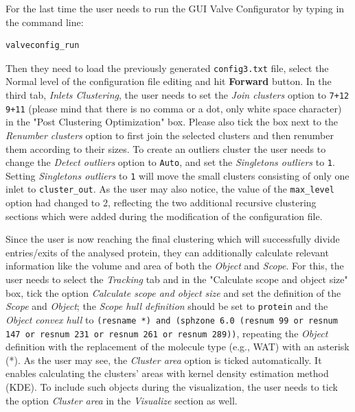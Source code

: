 \documentclass[9pt,tutorial]{livecoms}
\begin{document}
For the last time the user needs to run the GUI Valve Configurator by typing in the command line:
\begin{lstlisting}
valveconfig_run
\end{lstlisting}
Then they need to load the previously generated \texttt{config3.txt} file, select the Normal level of the configuration file editing and hit \textbf{Forward} button. In the third tab, \textit{Inlets Clustering}, the user needs to set the \emph{Join clusters} option to \texttt{7+12 9+11} (please mind that there is no comma or a dot, only white space character) in the "Post Clustering Optimization" box. Please also tick the box next to the \emph{Renumber clusters} option to first join the selected clusters and then renumber them according to their sizes. To create an outliers cluster the user needs to change the \emph{Detect outliers} option to \texttt{Auto}, and set the \emph{Singletons outliers} to \texttt{1}. Setting \emph{Singletons outliers} to \texttt{1} will move the small clusters consisting of only one inlet to \texttt{cluster\_out}. As the user may also notice, the value of the \texttt{max\_level} option had changed to 2, reflecting the two additional recursive clustering sections which were added during the modification of the configuration file. 

Since the user is now reaching the final clustering which will successfully divide entries/exits of the analysed protein, they can additionally calculate relevant information like the volume and area of both the \textit{Object} and \textit{Scope}. For this, the user needs to select the \textit{Tracking} tab and in the "Calculate scope and object size" box, tick the option \textit{Calculate scope and object size} and set the definition of the \textit{Scope} and \textit{Object}; the \textit{Scope hull definition} should be set to \texttt{protein} and the \textit{Object convex hull} to \texttt{(resname *) and (sphzone 6.0 (resnum 99 or resnum 147 or resnum 231 or resnum 261 or resnum 289))}, repeating the \textit{Object} definition with the replacement of the molecule type (e.g., WAT) with an asterisk (*). As the user may see, the \textit{Cluster area} option is ticked automatically. It enables calculating the clusters’ areas with kernel density estimation method (KDE). To include such objects during the visualization, the user needs to tick the option \textit{Cluster area} in the \textit{Visualize} section as well. 
\end{document}

